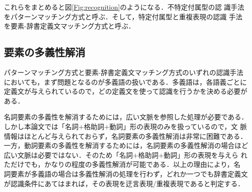 \documentclass{nlp}
\begin{document}
これらをまとめると図\ref{Fig:recognition}のようになる．不特定付属型の認
識手法をパターンマッチング方式と呼ぶ．そして，特定付属型と重複表現の認識
手法を要素-辞書定義文マッチング方式と呼ぶ．


\begin{figure*}[t]
 \begin{center}
  \caption{迂言表現と重複表現の認識手法}
  \label{Fig:recognition}
 \end{center}
\end{figure*}


\subsection{要素の多義性解消}
\label{section:WSD}
パターンマッチング方式と要素-辞書定義文マッチング方式のいずれの認識手法
においても，まず問題となるのが多義語の扱いである．多義語は，各語義ごとに
定義文が与えられているので，どの定義文を使って認識を行うかを決める必要が
ある．

名詞要素の多義性を解消するためには，広い文脈を参照した処理が必要である．
しかし本論文では「名詞$+$格助詞$+$動詞」形の表現のみを扱っているので，文
脈情報はほとんど与えられておらず，名詞要素の多義性解消は非常に困難である．
一方，動詞要素の多義性を解消するためには，名詞要素の多義性解消の場合ほど
広い文脈は必要ではない．そのため「名詞$+$格助詞$+$動詞」形の表現を与えら
れただけでも，かなりの程度の多義性解消が可能である．以上の理由により，名
詞要素が多義語の場合は多義性解消の処理を行わず，どれか一つでも辞書定義文
が認識条件にあてはまれば，その表現を迂言表現/重複表現であると判定する．
\end{document}
